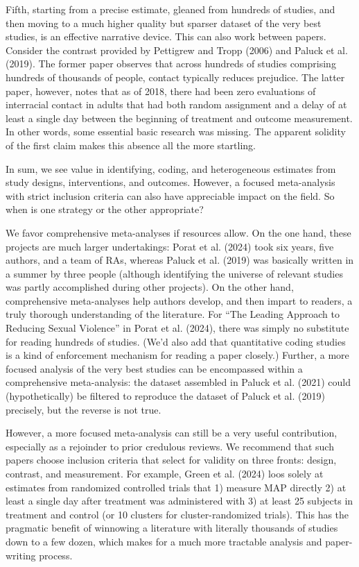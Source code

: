 \documentclass[
  ,jou]{apa6}
\begin{document}
Fifth, starting from a precise estimate, gleaned from hundreds of studies, and then moving to a much higher quality but sparser dataset of the very best studies, is an effective narrative device. This can also work between papers. Consider the contrast provided by Pettigrew and Tropp (2006) and Paluck et al. (2019). The former paper observes that across hundreds of studies comprising hundreds of thousands of people, contact typically reduces prejudice. The latter paper, however, notes that as of 2018, there had been zero evaluations of interracial contact in adults that had both random assignment and a delay of at least a single day between the beginning of treatment and outcome measurement. In other words, some essential basic research was missing. The apparent solidity of the first claim makes this absence all the more startling.

In sum, we see value in identifying, coding, and heterogeneous estimates from study designs, interventions, and outcomes. However, a focused meta-analysis with strict inclusion criteria can also have appreciable impact on the field. So when is one strategy or the other appropriate?

We favor comprehensive meta-analyses if resources allow. On the one hand, these projects are much larger undertakings: Porat et al. (2024) took six years, five authors, and a team of RAs, whereas Paluck et al. (2019) was basically written in a summer by three people (although identifying the universe of relevant studies was partly accomplished during other projects). On the other hand, comprehensive meta-analyses help authors develop, and then impart to readers, a truly thorough understanding of the literature. For ``The Leading Approach to Reducing Sexual Violence'' in Porat et al. (2024), there was simply no substitute for reading hundreds of studies. (We'd also add that quantitative coding studies is a kind of enforcement mechanism for reading a paper closely.) Further, a more focused analysis of the very best studies can be encompassed within a comprehensive meta-analysis: the dataset assembled in Paluck et al. (2021) could (hypothetically) be filtered to reproduce the dataset of Paluck et al. (2019) precisely, but the reverse is not true.

However, a more focused meta-analysis can still be a very useful contribution, especially as a rejoinder to prior credulous reviews. We recommend that such papers choose inclusion criteria that select for validity on three fronts: design, contrast, and measurement. For example, Green et al. (2024) loos solely at estimates from randomized controlled trials that 1) measure MAP directly 2) at least a single day after treatment was administered with 3) at least 25 subjects in treatment and control (or 10 clusters for cluster-randomized trials). This has the pragmatic benefit of winnowing a literature with literally thousands of studies down to a few dozen, which makes for a much more tractable analysis and paper-writing process.
\end{document}
